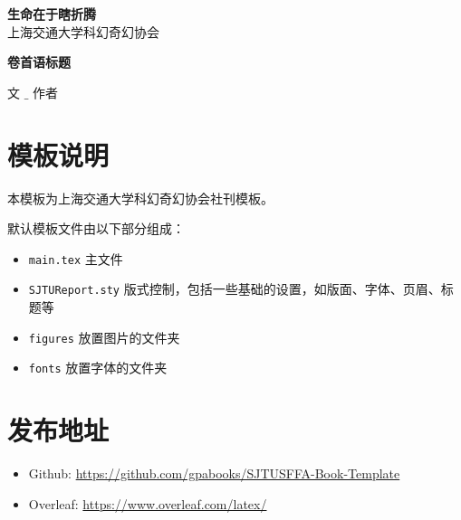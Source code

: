 \documentclass[9pt]{book}
\begin{document}
\frontmatter
\begin{titlepage}
  \centering
  \vspace*{7cm}
  {\Huge\bfseries \songti 生命在于瞎折腾} \\
  \vfill
  {\fzxztfw 上海交通大学科幻奇幻协会}
\end{titlepage}

\clearpage
\thispagestyle{empty} %
\null
\newpage

\begingroup
  \pagestyle{empty}
  \tableofcontents
  \thispagestyle{empty}
\endgroup

\clearpage
\thispagestyle{empty} %
\null
\newpage

\mainmatter

\newpage
{} %

\vspace*{-2em}
\noindent %
\parbox[t][1in][c]{\textwidth}{%
    {\Huge \bfseries 卷首语标题}
    \par
    \normalsize
    \vspace{2em}
    {文 $\_$ 作者}
}
\vspace*{4em}

\section*{模板说明}
本模板为上海交通大学科幻奇幻协会社刊模板。

默认模板文件由以下部分组成：

\begin{itemize}
    \item \texttt{main.tex} 主文件
    \item \texttt{SJTUReport.sty} 版式控制，包括一些基础的设置，如版面、字体、页眉、标题等
    \item \texttt{figures} 放置图片的文件夹
    \item \texttt{fonts} 放置字体的文件夹
\end{itemize}

\section*{发布地址}
\begin{itemize}
    \item Github: \url{https://github.com/gpabooks/SJTUSFFA-Book-Template}
    \item Overleaf:  \url{https://www.overleaf.com/latex/}
\end{itemize}
\end{document}
